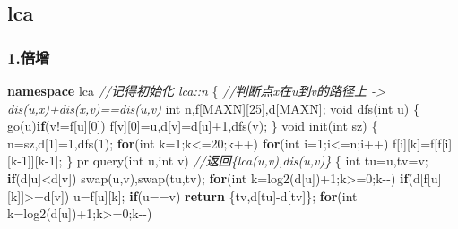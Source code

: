 \documentclass[
]{article}
\newenvironment{Shaded}{}{}
\newcommand{\CommentTok}[1]{\textcolor[rgb]{0.38,0.63,0.69}{\textit{#1}}}
\newcommand{\ControlFlowTok}[1]{\textcolor[rgb]{0.00,0.44,0.13}{\textbf{#1}}}
\newcommand{\DataTypeTok}[1]{\textcolor[rgb]{0.56,0.13,0.00}{#1}}
\newcommand{\DecValTok}[1]{\textcolor[rgb]{0.25,0.63,0.44}{#1}}
\newcommand{\KeywordTok}[1]{\textcolor[rgb]{0.00,0.44,0.13}{\textbf{#1}}}
\newcommand{\NormalTok}[1]{#1}
\begin{document}
\hypertarget{lca}{%
\subsection{lca}\label{lca}}

\hypertarget{ux500dux589e}{%
\subsubsection{1.倍增}\label{ux500dux589e}}

\begin{Shaded}
\begin{Highlighting}[]
\KeywordTok{namespace}\NormalTok{ lca }\CommentTok{//记得初始化 lca::n}
\NormalTok{\{}
    \CommentTok{//判断点x在u到v的路径上 {-}\textgreater{} dis(u,x)+dis(x,v)==dis(u,v)}
    \DataTypeTok{int}\NormalTok{ n,f[MAXN][}\DecValTok{25}\NormalTok{],d[MAXN];}
    \DataTypeTok{void}\NormalTok{ dfs(}\DataTypeTok{int}\NormalTok{ u)}
\NormalTok{    \{}
\NormalTok{        go(u)}\ControlFlowTok{if}\NormalTok{(v!=f[u][}\DecValTok{0}\NormalTok{])}
\NormalTok{            f[v][}\DecValTok{0}\NormalTok{]=u,d[v]=d[u]+}\DecValTok{1}\NormalTok{,dfs(v);}
\NormalTok{    \}}
    \DataTypeTok{void}\NormalTok{ init(}\DataTypeTok{int}\NormalTok{ sz)}
\NormalTok{    \{}
\NormalTok{        n=sz,d[}\DecValTok{1}\NormalTok{]=}\DecValTok{1}\NormalTok{,dfs(}\DecValTok{1}\NormalTok{);}
        \ControlFlowTok{for}\NormalTok{(}\DataTypeTok{int}\NormalTok{ k=}\DecValTok{1}\NormalTok{;k\textless{}=}\DecValTok{20}\NormalTok{;k++)}
            \ControlFlowTok{for}\NormalTok{(}\DataTypeTok{int}\NormalTok{ i=}\DecValTok{1}\NormalTok{;i\textless{}=n;i++)}
\NormalTok{                f[i][k]=f[f[i][k{-}}\DecValTok{1}\NormalTok{]][k{-}}\DecValTok{1}\NormalTok{];}
\NormalTok{    \}}
\NormalTok{    pr query(}\DataTypeTok{int}\NormalTok{ u,}\DataTypeTok{int}\NormalTok{ v) }\CommentTok{//返回\{lca(u,v),dis(u,v)\}}
\NormalTok{    \{}
        \DataTypeTok{int}\NormalTok{ tu=u,tv=v;}
        \ControlFlowTok{if}\NormalTok{(d[u]\textless{}d[v]) swap(u,v),swap(tu,tv);}
        \ControlFlowTok{for}\NormalTok{(}\DataTypeTok{int}\NormalTok{ k=log2(d[u])+}\DecValTok{1}\NormalTok{;k\textgreater{}=}\DecValTok{0}\NormalTok{;k{-}{-})}
            \ControlFlowTok{if}\NormalTok{(d[f[u][k]]\textgreater{}=d[v])}
\NormalTok{                u=f[u][k];}
        \ControlFlowTok{if}\NormalTok{(u==v) }\ControlFlowTok{return}\NormalTok{ \{tv,d[tu]{-}d[tv]\};}
        \ControlFlowTok{for}\NormalTok{(}\DataTypeTok{int}\NormalTok{ k=log2(d[u])+}\DecValTok{1}\NormalTok{;k\textgreater{}=}\DecValTok{0}\NormalTok{;k{-}{-})}

\end{Highlighting}
\end{Shaded}
\end{document}
